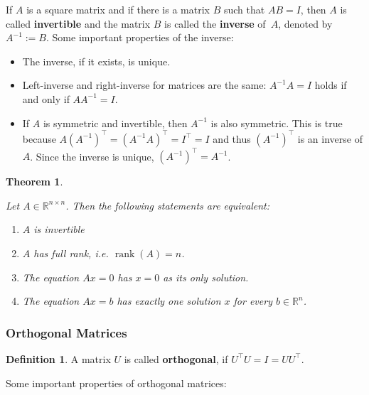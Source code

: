 \documentclass[
  a4paper,
]{article}
\providecommand{\tightlist}{%
  \setlength{\itemsep}{0pt}\setlength{\parskip}{0pt}}
\newtheorem{theorem}{Theorem}[section]
\theoremstyle{definition}
\newtheorem{definition}{Definition}[section]
\theoremstyle{definition}
\theoremstyle{definition}
\theoremstyle{definition}
\theoremstyle{remark}
\begin{document}
If \(A\) is a square matrix and if there is a matrix \(B\) such that
\(AB = I\), then \(A\) is called \textbf{invertible} and the matrix \(B\) is
called the \textbf{inverse} of~\(A\), denoted by \(A^{-1} := B\).
Some important properties of the inverse:

\begin{itemize}
\item
  The inverse, if it exists, is unique.
\item
  Left-inverse and right-inverse for matrices are the same:
  \(A^{-1} A = I\) holds if and only if \(A A^{-1} = I\).
\item
  If \(A\) is symmetric and invertible, then \(A^{-1}\) is also
  symmetric. This is true because \(A (A^{-1})^\top = (A^{-1} A)^\top = I^\top = I\) and thus \((A^{-1})^\top\) is an inverse of \(A\).
  Since the inverse is unique, \((A^{-1})^\top = A^{-1}\).
\end{itemize}

\begin{theorem}
\protect\hypertarget{thm:matrix-inverse}{}\label{thm:matrix-inverse}

Let \(A \in \mathbb{R}^{n\times n}\). Then the following statements are equivalent:

\begin{enumerate}
\def\labelenumi{\alph{enumi}.}
\tightlist
\item
  \(A\) is invertible
\item
  \(A\) has full rank, \emph{i.e.} \(\mathop{\mathrm{rank}}(A) = n\).
\item
  The equation \(Ax = 0\) has \(x = 0\) as its only solution.
\item
  The equation \(Ax = b\) has exactly one solution \(x\) for every
  \(b\in\mathbb{R}^n\).
\end{enumerate}

\end{theorem}

\hypertarget{orthogonal-matrices}{%
\subsubsection{Orthogonal Matrices}\label{orthogonal-matrices}}

\begin{definition}
A matrix \(U\) is called \textbf{orthogonal}, if \(U^\top U = I = U U^\top\).
\end{definition}

Some important properties of orthogonal matrices:
\end{document}
